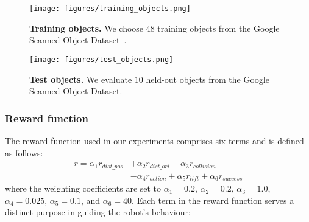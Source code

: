 \begin{figure}[t]
    \centering
    \texttt{[image: figures/training\_objects.png]}
    \caption{\textbf{Training objects.} We choose $48$ training objects from the Google Scanned Object Dataset~\cite{downs2022googlescannedobjectshighquality}.}
    \label{fig:training_objects}
\end{figure}


\begin{figure}[t]
    \centering
    \texttt{[image: figures/test\_objects.png]}
    \caption{\textbf{Test objects.} We evaluate $10$ held-out objects from the Google Scanned Object Dataset.}
    \label{fig:test_objects}
\end{figure}

\subsubsection{Reward function}
The reward function used in our experiments comprises six terms and is defined as follows:
\begin{equation}
    \begin{split}
    r = \alpha_{1} r_{dist\_pos} &+ 
    \alpha_{2} r_{dist\_ori} - \alpha_{3} r_{collision} \\
    & - \alpha_{4} r_{action} + \alpha_{5} r_{lift} + \alpha_{6} r_{success}        
    \end{split}
\end{equation}
where the weighting coefficients are set to $\alpha_1 = 0.2$, $\alpha_2 = 0.2$, $\alpha_3 = 1.0$, $\alpha_4 = 0.025$, $\alpha_5 = 0.1$, and $\alpha_6 = 40$. Each term in the reward function serves a distinct purpose in guiding the robot’s behaviour:

